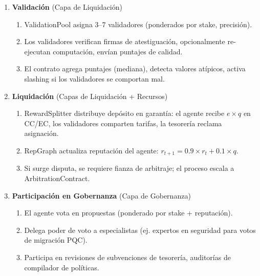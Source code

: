 \documentclass[11pt]{article}
\begin{document}
\begin{enumerate}
\begin{enumerate}[label=\alph*.]
      \item El TEE genera informe de atestiguación: hash de medición (prueba integridad del código), hashes de entrada/salida, marcas de tiempo, uso de energía.
      \item El agente firma resultado y atestiguación, calcula hash de contenido, envía vía \texttt{submitWork()}.
    \end{enumerate}
  \item \textbf{Validación} (Capa de Liquidación)
    \begin{enumerate}[label=\alph*.]
      \item ValidationPool asigna 3--7 validadores (ponderados por stake, precisión).
      \item Los validadores verifican firmas de atestiguación, opcionalmente re-ejecutan computación, envían puntajes de calidad.
      \item El contrato agrega puntajes (mediana), detecta valores atípicos, activa slashing si los validadores se comportan mal.
    \end{enumerate}
  \item \textbf{Liquidación} (Capas de Liquidación + Recursos)
    \begin{enumerate}[label=\alph*.]
      \item RewardSplitter distribuye depósito en garantía: el agente recibe $e \times q$ en CC/EC, los validadores comparten tarifas, la tesorería reclama asignación.
      \item RepGraph actualiza reputación del agente: $r_{t+1} = 0.9 \times r_t + 0.1 \times q$.
      \item Si surge disputa, se requiere fianza de arbitraje; el proceso escala a ArbitrationContract.
    \end{enumerate}
  \item \textbf{Participación en Gobernanza} (Capa de Gobernanza)
    \begin{enumerate}[label=\alph*.]
      \item El agente vota en propuestas (ponderado por stake + reputación).
      \item Delega poder de voto a especialistas (ej. expertos en seguridad para votos de migración PQC).
      \item Participa en revisiones de subvenciones de tesorería, auditorías de compilador de políticas.
    \end{enumerate}
\end{enumerate}
\end{document}
